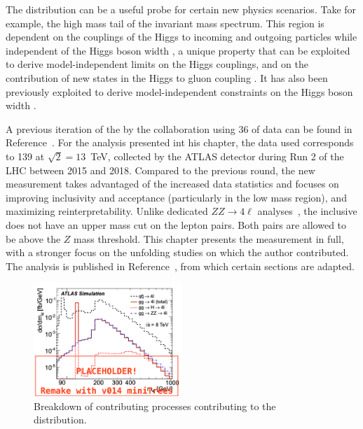 The \mFourL{} distribution can be a useful probe for certain new physics scenarios. Take for example, the high mass tail of the invariant mass spectrum. This region is dependent on the couplings of the Higgs to incoming and outgoing particles while independent of the Higgs boson width \cite{Campbell_2016}, a unique property that can be exploited to derive model-independent limits on the Higgs couplings, and on the  contribution of new states in the Higgs to gluon coupling \cite{Cacciapaglia_2014}. It has also been previously exploited to derive model-independent constraints on the Higgs boson width \cite{Caola_2013}. 

A previous iteration of the \mFourL{} by the \ATLAS collaboration using \unit{36}{\invfb} of data can be found in Reference~\cite{Aaboud:2019lxo}. For the analysis presented int his chapter, the data used corresponds to \unit{139}{\invfb} at $\sqrt{2}=13$~TeV, collected by the ATLAS detector during Run 2 of the LHC between 2015 and 2018. Compared to the previous round, the new \mFourL{} measurement takes advantaged of the increased data statistics and focuses on improving inclusivity and acceptance (particularly in the low mass region), and maximizing reinterpretability. Unlike dedicated $ZZ\rightarrow 4\ell$ analyses~\cite{Sirunyan:s10052-018-5567-9,Aaboud:97.032005}, the inclusive \mFourL{} does not have an upper mass cut on the lepton pairs. Both pairs are allowed to be above the $Z$ mass threshold. This chapter presents the measurement in full, with a stronger focus on the unfolding studies on which the author contributed. The analysis is published in Reference~\cite{m4l2021_paper}, from which certain sections are adapted.

\begin{figure}
    \centering
    \includegraphics[width=0.5\textwidth]{Figures/m4l/m4lbreakdown.png}
    \caption{Breakdown of contributing processes contributing to the \mFourL{} distribution.}
    \label{fig:m4lbreakdown}
\end{figure}

